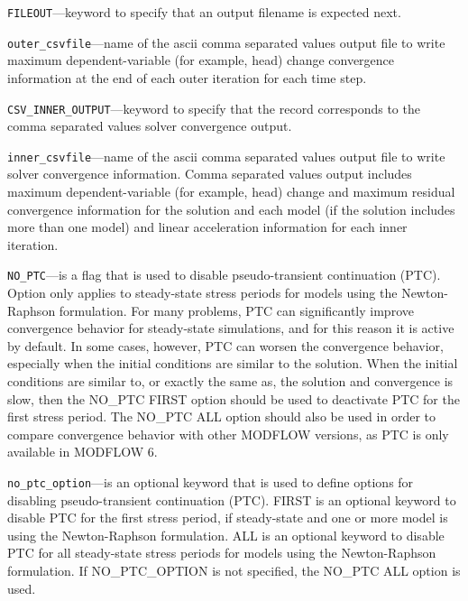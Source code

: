 \begin{description}
\item \texttt{FILEOUT}---keyword to specify that an output filename is expected next.

\item \texttt{outer\_csvfile}---name of the ascii comma separated values output file to write maximum dependent-variable (for example, head) change convergence information at the end of each outer iteration for each time step.

\item \texttt{CSV\_INNER\_OUTPUT}---keyword to specify that the record corresponds to the comma separated values solver convergence output.

\item \texttt{inner\_csvfile}---name of the ascii comma separated values output file to write solver convergence information. Comma separated values output includes maximum dependent-variable (for example, head) change and maximum residual convergence information for the solution and each model (if the solution includes more than one model) and linear acceleration information for each inner iteration.

\item \texttt{NO\_PTC}---is a flag that is used to disable pseudo-transient continuation (PTC). Option only applies to steady-state stress periods for models using the Newton-Raphson formulation. For many problems, PTC can significantly improve convergence behavior for steady-state simulations, and for this reason it is active by default.  In some cases, however, PTC can worsen the convergence behavior, especially when the initial conditions are similar to the solution.  When the initial conditions are similar to, or exactly the same as, the solution and convergence is slow, then the NO\_PTC FIRST option should be used to deactivate PTC for the first stress period.  The NO\_PTC ALL option should also be used in order to compare convergence behavior with other MODFLOW versions, as PTC is only available in MODFLOW 6.

\item \texttt{no\_ptc\_option}---is an optional keyword that is used to define options for disabling pseudo-transient continuation (PTC). FIRST is an optional keyword to disable PTC for the first stress period, if steady-state and one or more model is using the Newton-Raphson formulation. ALL is an optional keyword to disable PTC for all steady-state stress periods for models using the Newton-Raphson formulation. If NO\_PTC\_OPTION is not specified, the NO\_PTC ALL option is used.


\end{description}
